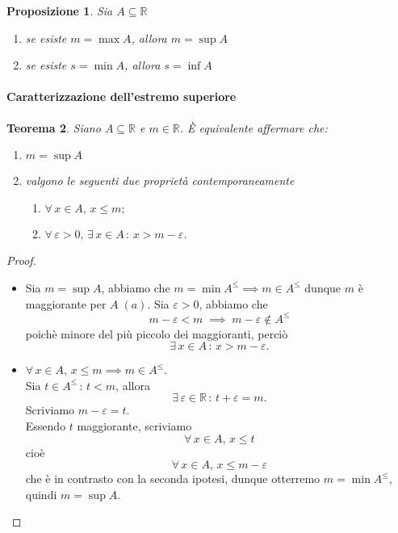 \documentclass{article}
\theoremstyle{plain}
\newtheorem{thm}{Teorema}[section]
\newtheorem{prop}[thm]{Proposizione}
\theoremstyle{definition}
\theoremstyle{remark}
\begin{document}
\vspace{10pt}

\begin{bxthm}
\begin{prop}
    Sia $A\subseteq\mathbb{R}$
    \begin{enumerate}
        \item se esiste $m=\max A$, allora $m=\sup A $
        \item se esiste $s=\min A$, allora $s=\inf A$
    \end{enumerate}
\end{prop}
\end{bxthm}

\vspace{10pt}

\paragraph{Caratterizzazione dell'estremo superiore}
\begin{bxthm}
\begin{thm}\label{carattestremosuperior}
    Siano $A\subseteq\mathbb{R}$ e $m\in\mathbb{R}$.
    È equivalente affermare che:
    \begin{enumerate}
        \item[($a$)] $m=\sup A$ 
        \item[($b$)] valgono le seguenti due proprietà contemporaneamente
        \begin{enumerate}
            \item $\forall\, x\in A,\, x\leq m;$
            \item $\forall\, \varepsilon > 0,\, \exists\, x\in A\,:\,x>m-\varepsilon$.
        \end{enumerate}
    \end{enumerate}
\end{thm}
\end{bxthm}
\begin{proof}\hfill
    \begin{itemize}
        \item[$a\implies b$]
        Sia $m=\sup A$, abbiamo che $m=\min A^\leq\implies m\in A^\leq$ dunque $m$ è maggiorante per $A\;(a)$.
        Sia $\varepsilon>0$, abbiamo che \[m-\varepsilon<m\;\implies\; m-\varepsilon\notin A^\leq\]
        poichè minore del più piccolo dei maggioranti, perciò \[\exists\, x\in A\,:\,x>m-\varepsilon.\]
        \item[$b\implies a$]
        $\forall\, x\in A,\, x\leq m\implies m\in A^\leq$.\\
        Sia $t\in A^\leq\,:\,t<m$, allora \[\exists\, \varepsilon\in\mathbb{R}\,:\,t+\varepsilon=m.\]
        Scriviamo $m-\varepsilon=t$.\\
        Essendo $t$ maggiorante, scriviamo \[\forall\, x\in A,\,x\leq t\] cioè \[\forall\, x\in A,\,x\leq m-\varepsilon\]
        che è in contrasto con la seconda ipotesi, dunque otterremo $m=\min A^\leq$, quindi $m=\sup A$.
    \end{itemize}        
\end{proof}
\end{document}
